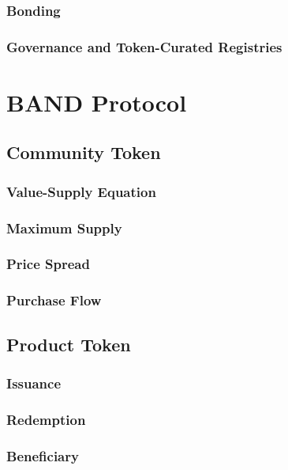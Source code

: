 \documentclass[letterpaper,11pt]{article}
\begin{document}
\subsubsection{Bonding}

\subsubsection{Governance and Token-Curated Registries}

\section{BAND Protocol}

\subsection{Community Token}

\subsubsection{Value-Supply Equation}

\subsubsection{Maximum Supply}

\subsubsection{Price Spread}

\subsubsection{Purchase Flow}

\subsection{Product Token}

\subsubsection{Issuance}

\subsubsection{Redemption}

\subsubsection{Beneficiary}
\end{document}
